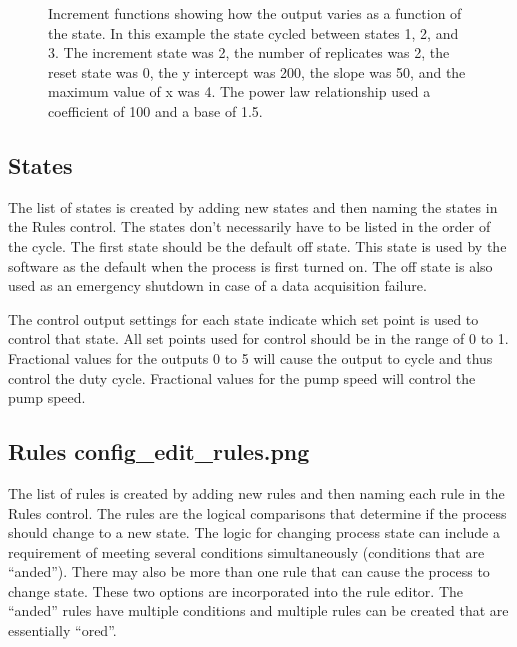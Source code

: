\documentclass[letterpaper,10pt,english]{sphinxmanual}
\let\sphinxpxdimen\pdfpxdimen\else\newdimen\sphinxpxdimen
\begin{document}
\begin{figure}[htbp]
\centering
\capstart

\noindent\sphinxincludegraphics[width=600\sphinxpxdimen]{{increment_functions}.png}
\caption{Increment functions showing how the output varies as a function of the state. In this example the state cycled between states 1, 2, and 3. The increment state was 2, the number of replicates was 2, the reset state was 0, the y intercept was 200, the slope was 50, and the maximum value of x was 4. The power law relationship used a coefficient of 100 and a base of 1.5.}\label{\detokenize{ProCoDA/ProCoDA:id6}}\label{\detokenize{ProCoDA/ProCoDA:figure-increment-functions}}\end{figure}


\subsection{States}
\label{\detokenize{ProCoDA/ProCoDA:states}}\label{\detokenize{ProCoDA/ProCoDA:heading-procoda-states}}
The list of states is created by adding new states and then naming the states in the Rules control. The states don’t necessarily have to be listed in the order of the cycle. The first state should be the default off state. This state is used by the software as the default when the process is first turned on. The off state is also used as an emergency shutdown in case of a data acquisition failure.

The control output settings for each state indicate which set point is used to control that state. All set points used for control should be in the range of 0 to 1. Fractional values for the outputs 0 to 5 will cause the output to cycle and thus control the duty cycle. Fractional values for the pump speed will control the pump speed.


\subsection[Rules]{Rules \lowercase{\sphinxincludegraphics}{{config_edit_rules}.png}}
\label{\detokenize{ProCoDA/ProCoDA:rules-config-edit-rules}}\label{\detokenize{ProCoDA/ProCoDA:heading-procoda-rules}}
The list of rules is created by adding new rules and then naming each rule in the Rules control. The rules are the logical comparisons that determine if the process should change to a new state. The logic for changing process state can include a requirement of meeting several conditions simultaneously (conditions that are “anded”). There may also be more than one rule that can cause the process to change state. These two options are incorporated into the rule editor. The “anded” rules have multiple conditions and multiple rules can be created that are essentially “ored”.
\end{document}
